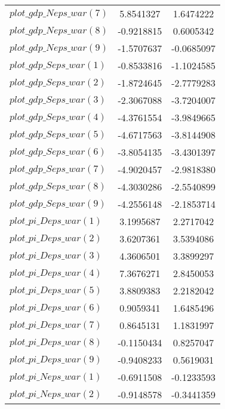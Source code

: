 \begin{center}
\begin{longtable}{lcc}
$plot\_gdp\_N eps\_war (7)  $	 & 	      5.8541327	 & 	      1.6474222 \\ 
$plot\_gdp\_N eps\_war (8)  $	 & 	     -0.9218815	 & 	      0.6005342 \\ 
$plot\_gdp\_N eps\_war (9)  $	 & 	     -1.5707637	 & 	     -0.0685097 \\ 
$plot\_gdp\_S eps\_war (1)  $	 & 	     -0.8533816	 & 	     -1.1024585 \\ 
$plot\_gdp\_S eps\_war (2)  $	 & 	     -1.8724645	 & 	     -2.7779283 \\ 
$plot\_gdp\_S eps\_war (3)  $	 & 	     -2.3067088	 & 	     -3.7204007 \\ 
$plot\_gdp\_S eps\_war (4)  $	 & 	     -4.3761554	 & 	     -3.9849665 \\ 
$plot\_gdp\_S eps\_war (5)  $	 & 	     -4.6717563	 & 	     -3.8144908 \\ 
$plot\_gdp\_S eps\_war (6)  $	 & 	     -3.8054135	 & 	     -3.4301397 \\ 
$plot\_gdp\_S eps\_war (7)  $	 & 	     -4.9020457	 & 	     -2.9818380 \\ 
$plot\_gdp\_S eps\_war (8)  $	 & 	     -4.3030286	 & 	     -2.5540899 \\ 
$plot\_gdp\_S eps\_war (9)  $	 & 	     -4.2556148	 & 	     -2.1853714 \\ 
$plot\_pi\_D eps\_war (1)   $	 & 	      3.1995687	 & 	      2.2717042 \\ 
$plot\_pi\_D eps\_war (2)   $	 & 	      3.6207361	 & 	      3.5394086 \\ 
$plot\_pi\_D eps\_war (3)   $	 & 	      4.3606501	 & 	      3.3899297 \\ 
$plot\_pi\_D eps\_war (4)   $	 & 	      7.3676271	 & 	      2.8450053 \\ 
$plot\_pi\_D eps\_war (5)   $	 & 	      3.8809383	 & 	      2.2182042 \\ 
$plot\_pi\_D eps\_war (6)   $	 & 	      0.9059341	 & 	      1.6485496 \\ 
$plot\_pi\_D eps\_war (7)   $	 & 	      0.8645131	 & 	      1.1831997 \\ 
$plot\_pi\_D eps\_war (8)   $	 & 	     -0.1150434	 & 	      0.8257047 \\ 
$plot\_pi\_D eps\_war (9)   $	 & 	     -0.9408233	 & 	      0.5619031 \\ 
$plot\_pi\_N eps\_war (1)   $	 & 	     -0.6911508	 & 	     -0.1233593 \\ 
$plot\_pi\_N eps\_war (2)   $	 & 	     -0.9148578	 & 	     -0.3441359 \\ 

\end{longtable}
\end{center}

